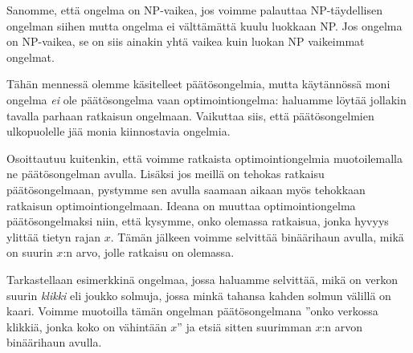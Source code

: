 Sanomme, että ongelma on NP-vaikea, jos voimme palauttaa
NP-täydellisen ongelman siihen mutta ongelma ei välttämättä
kuulu luokkaan NP.
Jos ongelma on NP-vaikea, se on siis ainakin yhtä vaikea
kuin luokan NP vaikeimmat ongelmat.

Tähän mennessä olemme käsitelleet päätösongelmia,
mutta käytännössä moni ongelma \emph{ei} ole päätösongelma
vaan optimointiongelma: haluamme löytää jollakin
tavalla parhaan ratkaisun ongelmaan.
Vaikuttaa siis, että päätöson\-gelmien ulkopuolelle jää
monia kiinnostavia ongelmia.

Osoittautuu kuitenkin, että voimme ratkaista optimointiongelmia
muotoilemalla ne päätösongelman avulla.
Lisäksi jos meillä on tehokas ratkaisu päätösongelmaan,
pystymme sen avulla saamaan aikaan myös tehokkaan
ratkaisun optimointiongelmaan.
Ideana on muuttaa optimointiongelma päätös\-ongelmaksi niin,
että kysymme, onko olemassa ratkaisua, jonka hyvyys ylittää
tietyn rajan $x$. Tämän jälkeen voimme selvittää binäärihaun
avulla, mikä on suurin $x$:n arvo, jolle ratkaisu on olemassa.

Tarkastellaan esimerkkinä ongelmaa, jossa haluamme selvittää,
mikä on verkon suurin \emph{klikki} eli joukko solmuja,
jossa minkä tahansa kahden solmun välillä on kaari.
Voimme muotoilla tämän ongelman päätösongelmana
''onko verkossa klikkiä, jonka koko on vähintään $x$''
ja etsiä sitten suurimman $x$:n arvon binäärihaun avulla.